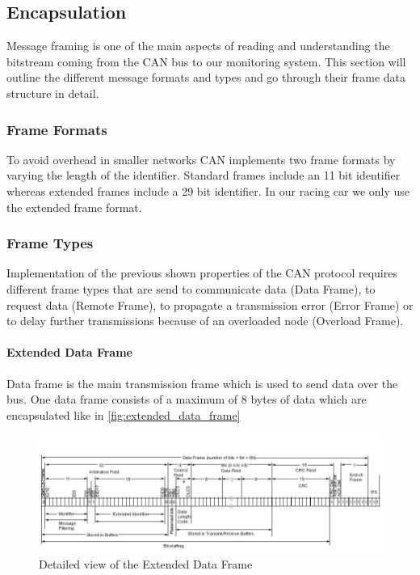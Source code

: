 \subsection{Encapsulation}
Message framing is one of the main aspects of reading and understanding the
bitstream coming from the CAN bus to our monitoring system. This section will
outline the different message formats and types and go through their frame data
structure in detail.
	\subsubsection{Frame Formats}
	To avoid overhead in smaller networks CAN implements two frame formats by
	varying the length of the identifier. Standard frames include an 11 bit
	identifier whereas extended frames include a 29 bit identifier. In our racing
	car we only use the extended frame format.
	\subsubsection{Frame Types}
	Implementation of the previous shown properties of the CAN protocol requires
	different frame types that are send to communicate data (Data Frame), to
	request data (Remote Frame), to propagate a transmission error (Error Frame) or
	to delay further transmissions because of an overloaded node (Overload Frame).
	\paragraph{Extended Data Frame}
	Data frame is the main transmission frame which is used to send data over the
	bus. One data frame consists of a maximum of 8 bytes of data which are
	encapsulated like in \autoref{fig:extended_data_frame}
	
	\begin{figure}[htb] \centering
		\includegraphics[width=1\textwidth]{content/pictures/EDF}
		\caption{Detailed view of the Extended Data Frame}
		\label{fig:extended_data_frame}
	\end{figure}
	
